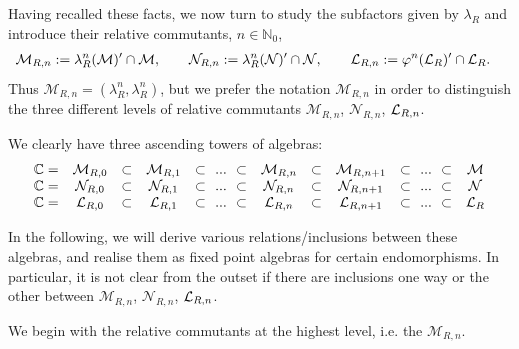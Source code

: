 \documentclass[12pt,a4paper]{amsart}
\numberwithin{equation}{section}
\theoremstyle{remark}
\newcommand{\Cl}{\mathbb{C}}
\newcommand{\Nl}{\mathbb{N}}
\newcommand{\la}{\lambda}
\newcommand{\CM}[0]{\mathcal{M}} \newcommand{\CN}[0]{\mathcal{N}}
\begin{document}
Having recalled these facts, we now turn to study the subfactors given by $\la_R$ and introduce their relative commutants, $n\in\Nl_0$,
\begin{align*}
 \CM_{R,n}
 &:=
 \la_R^n(\CM)'\cap\CM,
 \qquad 
 \CN_{R,n}
 :=
 \la_R^n(\CN)'\cap\CN,
 \qquad
 \CL_{R,n}
 :=
 \varphi^n(\CL_R)'\cap\CL_R.
\end{align*}
Thus $\CM_{R,n}=(\la_R^n,\la_R^n)$, but we prefer the notation $\CM_{R,n}$ in order to distinguish the three different levels of relative commutants $\CM_{R,n}$, $\CN_{R,n}$, $\mathcal{L}_{R,n}$.

We clearly have three ascending towers of algebras:
\begin{equation} \label{eq:thethreetowers}
    \begin{array}{ccccccccccccccc}
        \Cl =
        & \CM_{R,0}
        &\subset
        & \CM_{R,1}
        &\subset
        & \!\!...\!\!
        &\subset
        & \CM_{R,n}
        &\subset
        & \CM_{R,n+1}
        &\subset
        & \!\!...\!\!
        &\subset
        & \CM
        \\
         \Cl =
        & \CN_{R,0}
        &\subset
        & \CN_{R,1}
        &\subset
        & \!\!...\!\!
        &\subset
        & \CN_{R,n}
        &\subset
        & \CN_{R,n+1}
        &\subset
        & \!\!...\!\!
        &\subset
        & \CN
        \\
        \Cl =
        & \CL_{R,0}
        &\subset
        & \CL_{R,1}
        &\subset
        & \!\!...\!\!
        &\subset
        & \CL_{R,n}
        &\subset
        & \CL_{R,n+1}
        &\subset
        & \!\!...\!\!
        &\subset
        & \CL_R
    \end{array}
\end{equation}

In the following, we will derive various relations/inclusions between these algebras, and realise them as fixed point algebras for certain endomorphisms. In particular, it is not clear from the outset if there are inclusions one way or the other between $\CM_{R,n}$, $\CN_{R,n}$, $\mathcal{L}_{R,n}$. 

We begin with the relative commutants at the highest level, i.e. the $\CM_{R,n}$.
\end{document}
